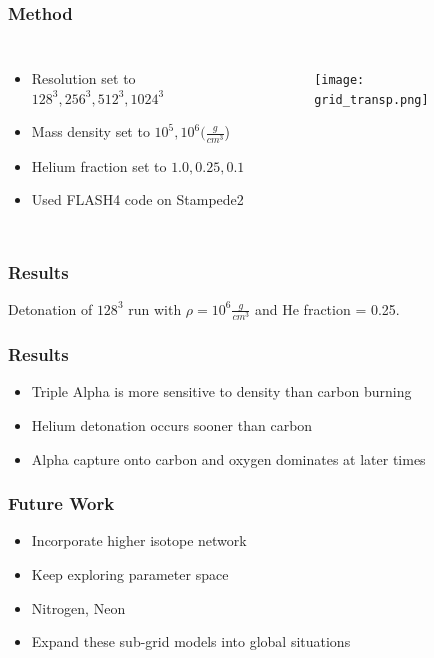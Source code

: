 \documentclass{beamer}
\begin{document}

\begin{frame}
\frametitle{Method}

\begin{columns}[c]
        \begin{itemize}
                \item Resolution set to $128^3, 256^3, 512^3, 1024^3$
                \item Mass density set to $10^5, 10^6 (\frac{g}{cm^3}$)
		\item Helium fraction set to $1.0, 0.25, 0.1$
                \item Used FLASH4 code on Stampede2
        \end{itemize}


        \vspace{25pt}
        \begin{figure}
    \begin{center}
      \texttt{[image: grid\_transp.png]}
    \end{center}
  \end{figure}

        \end{columns}

\end{frame}



\begin{frame}
	
	\frametitle{Results}
	\begin{center}
	\end{center}
	\begin{center} 
		Detonation of $128^{3}$ run with $\rho = 10^6 \frac{g}{cm^3}$ and He fraction = 0.25.
	\end{center}
\end{frame}

\begin{frame}
	\frametitle{Results}
	\begin{itemize}
		\item Triple Alpha is more sensitive to density than carbon burning
		\item Helium detonation occurs sooner than carbon
		\item Alpha capture onto carbon and oxygen dominates at later times
	\end{itemize}
\end{frame}


\begin{frame}
	\frametitle{Future Work}
	\begin{itemize}
		\item Incorporate higher isotope network
		\item Keep exploring parameter space
		\item Nitrogen, Neon
		\item Expand these sub-grid models into global situations
	\end{itemize}
\end{frame}
\end{document}
